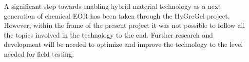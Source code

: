 \documentclass[energies,article,submit,moreauthors,pdftex]{Definitions/mdpi}
\begin{document}
A significant step towards enabling hybrid material technology as a next generation of chemical EOR has been taken through the HyGreGel project. However, within the frame of the present project it was not possible to follow all the topics involved in the technology to the end. Further research and development will be needed to optimize and improve the technology to the level needed for field testing. 








\vspace{6pt} 





\end{document}
